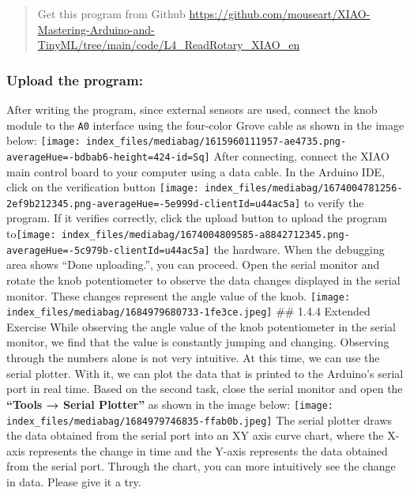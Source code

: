 \documentclass[
  letterpaper,
  DIV=11,
  numbers=noendperiod]{scrreprt}
\begin{document}
\begin{quote}
Get this program from Github
\url{https://github.com/mouseart/XIAO-Mastering-Arduino-and-TinyML/tree/main/code/L4_ReadRotary_XIAO_en}
\end{quote}

\hypertarget{upload-the-program-1}{%
\subsubsection*{Upload the program:}\label{upload-the-program-1}}

After writing the program, since external sensors are used, connect the
knob module to the \texttt{A0} interface using the four-color Grove
cable as shown in the image below:
\texttt{[image: index\_files/mediabag/1615960111957-ae4735.png-averageHue=-bdbab6-height=424-id=Sq]}
After connecting, connect the XIAO main control board to your computer
using a data cable. In the Arduino IDE, click on the verification button
\texttt{[image: index\_files/mediabag/1674004781256-2ef9b212345.png-averageHue=-5e999d-clientId=u44ac5a]}
to verify the program. If it verifies correctly, click the upload button
to upload the program
to\texttt{[image: index\_files/mediabag/1674004809585-a8842712345.png-averageHue=-5c979b-clientId=u44ac5a]}
the hardware. When the debugging area shows ``Done uploading.'', you can
proceed. Open the serial monitor and rotate the knob potentiometer to
observe the data changes displayed in the serial monitor. These changes
represent the angle value of the knob.
\texttt{[image: index\_files/mediabag/1684979680733-1fe3ce.jpeg]} \#\#
1.4.4 Extended Exercise While observing the angle value of the knob
potentiometer in the serial monitor, we find that the value is
constantly jumping and changing. Observing through the numbers alone is
not very intuitive. At this time, we can use the serial plotter. With
it, we can plot the data that is printed to the Arduino's serial port in
real time. Based on the second task, close the serial monitor and open
the \textbf{``Tools → Serial Plotter''} as shown in the image below:
\texttt{[image: index\_files/mediabag/1684979746835-ffab0b.jpeg]} The
serial plotter draws the data obtained from the serial port into an XY
axis curve chart, where the X-axis represents the change in time and the
Y-axis represents the data obtained from the serial port. Through the
chart, you can more intuitively see the change in data. Please give it a
try.

\end{document}
